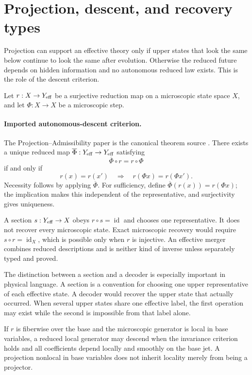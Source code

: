 \documentclass[11pt]{article}
\begin{document}
\section{Projection, descent, and recovery types}

Projection can support an effective theory only if upper states that look the
same below continue to look the same after evolution. Otherwise the reduced
future depends on hidden information and no autonomous reduced law exists.
This is the role of the descent criterion.

Let $r:X\to Y_{\rm eff}$ be a surjective reduction map on a microscopic state
space $X$, and let $\Phi:X\to X$ be a microscopic step.

\paragraph{Imported autonomous-descent criterion.}
The Projection--Admissibility paper is the canonical theorem source
\cite{Projection}. There exists a unique reduced map
$\overline\Phi:Y_{\rm eff}\to Y_{\rm eff}$
satisfying
\[
 \overline\Phi\circ r=r\circ\Phi
\]
if and only if
\[
 r(x)=r(x')\quad\Longrightarrow\quad r(\Phi x)=r(\Phi x').
\]
Necessity follows by applying $\overline\Phi$. For sufficiency, define
$\overline\Phi(r(x))=r(\Phi x)$; the implication makes this independent of the
representative, and surjectivity gives uniqueness.

A section $s:Y_{\rm eff}\to X$ obeys $r\circ s=\operatorname{id}$ and chooses
one representative. It does not recover every microscopic state. Exact
microscopic recovery would require $s\circ r=\operatorname{id}_X$, which is
possible only when $r$ is injective. An effective merger combines reduced
descriptions and is neither kind of inverse unless separately typed and
proved.

The distinction between a section and a decoder is especially important in
physical language. A section is a convention for choosing one upper
representative of each effective state. A decoder would recover the upper
state that actually occurred. When several upper states share one effective
label, the first operation may exist while the second is impossible from that
label alone.

If $r$ is fiberwise over the base and the microscopic generator is local in
base variables, a reduced local generator may descend when the invariance
criterion holds and all coefficients depend locally and smoothly on the base
jet. A projection nonlocal in base variables does not inherit locality merely
from being a projector.
\end{document}
